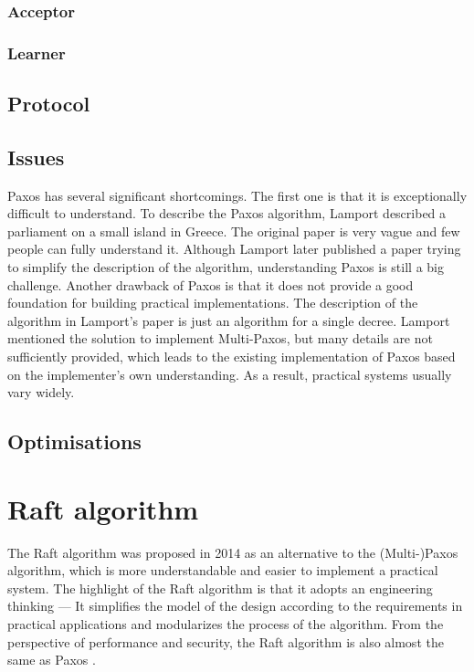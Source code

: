 \documentclass[12pt, a4paper]{article}
\begin{document}
  \subsubsection{Acceptor}

  \subsubsection{Learner}

\subsection{Protocol}

\subsection{Issues}
Paxos has several significant shortcomings. The first one is that it 
is exceptionally difficult to understand\cite{conf/usenix/OngaroO14}. 
To describe the Paxos algorithm, Lamport described a parliament on a 
small island in Greece\cite{lamport1998part}. The original paper is 
very vague and few people can fully understand it. Although Lamport 
later published a paper trying to simplify the description of the 
algorithm\cite{lamport2001paxos}, understanding Paxos is still a big 
challenge. Another drawback of Paxos is that it does not provide a 
good foundation for building practical implementations\cite{conf/usenix/OngaroO14}.
The description of the algorithm in Lamport's paper is just an 
algorithm for a single decree. Lamport mentioned the solution to 
implement Multi-Paxos, but many details are not sufficiently provided, 
which leads to the existing implementation of Paxos based on the 
implementer's own understanding. As a result, practical systems usually
vary widely.

\subsection{Optimisations}


\section{Raft algorithm} \label{sec:raft}
The Raft algorithm was proposed in 2014\cite{conf/usenix/OngaroO14} as an alternative to the (Multi-)Paxos algorithm, which is more
understandable and easier to implement a practical system. The highlight of the Raft algorithm is that it adopts an
engineering thinking --- It simplifies the model of the design according to the requirements in practical applications and
modularizes the process of the algorithm. From the perspective of performance and security, the Raft algorithm is also almost
the same as Paxos \cite{conf/usenix/OngaroO14}.
\end{document}
